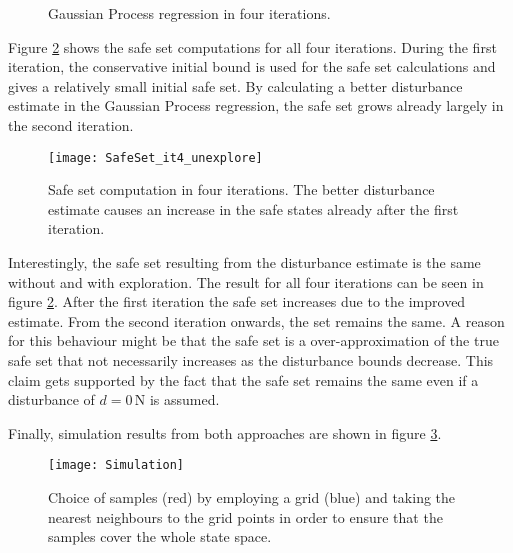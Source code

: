 \documentclass[../main.tex]{subfiles}
\begin{document}
\begin{figure}[H]
    \centering
        \caption{Gaussian Process regression in four iterations.}  \label{fig:GP_it4_doubleexplore}
\end{figure}


Figure \ref{fig:SafeSet_it4_unexplore} shows the safe set computations for all four iterations. During the first iteration, the conservative initial bound is used for the safe set calculations and gives a relatively small initial safe set. By calculating a better disturbance estimate in the Gaussian Process regression, the safe set grows already largely in the second iteration. 
\begin{figure}[h]
    \centering
    \texttt{[image: SafeSet\_it4\_unexplore]}
        \caption{Safe set computation in four iterations. The better disturbance estimate causes an increase in the safe states already after the first iteration.}  \label{fig:SafeSet_it4_unexplore}
\end{figure}

Interestingly, the safe set resulting from the disturbance estimate is the same without and with exploration. The result for all four iterations can be seen in figure \ref{fig:SafeSet_it4_unexplore}. After the first iteration the safe set increases due to the improved estimate. From the second iteration onwards, the set remains the same. A reason for this behaviour might be that the safe set is a over-approximation of the true safe set that not necessarily increases as the disturbance bounds decrease. This claim gets supported by the fact that the safe set remains the same even if a disturbance of $d = 0\,\text{N}$ is assumed.\par

Finally, simulation results from both approaches are shown in figure \ref{fig:Simulation}.

\begin{figure}
    \centering
    \texttt{[image: Simulation]}
        \caption{Choice of samples (red) by employing a grid (blue) and taking the nearest neighbours to the grid points in order to ensure that the samples cover the whole state space.}  \label{fig:Simulation}
\end{figure}
\end{document}
